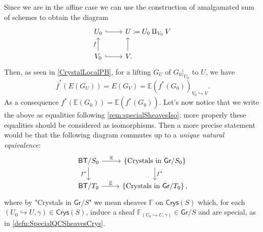 \begin{rem}\label{PBCrystals}
	Since we are in the affine case we can use the construction of amalgamated
	sum of schemes to obtain the diagram
	\begin{equation*}
	\begin{tikzcd}[/tikz/column 2/.append style={anchor=base west}]
		U_0 \arrow[r, "", hookrightarrow] &
		U \coloneqq U_0 \amalg_{V_0} V \\
		V_0 \arrow[u, "f", rightarrow] 
		\arrow[r, "", hookrightarrow] &
		V \arrow[u, "", rightarrow, end anchor={[xshift=1.84ex,yshift=0.29ex]south west},
		start anchor={[xshift=0.38ex]}] 
	.\end{tikzcd}
	\end{equation*}
	Then, as seen in \cref{CrystalLocalPB}, for a lifting $G_U$ 
	of $\left.G_0\right|_{U_0}$ to $U$, we have
	\begin{equation*}
		\overline{f}^* \left( E(G_U) \right) =
		E(G_V) = \mathbb{E} \left( f^* (G_0) \right)_{V_0 \hookrightarrow V}
	.\end{equation*}
	As a consequence $f^* \left( \mathbb{E}(G_0) \right) =
	\mathbb{E}\left( f^*(G_0) \right)$.
	Let's now notice that we write the above as equalities following \cref{rem:specialSheavesIso};
	more properly these equalities should be considered as isomorphisms.
	Then a more precise statement would be that the following diagram
	commutes up to a {\em unique natural equivalence}:
	\begin{equation*}
	\begin{tikzcd}
		\mathsf{BT}/S_0
		\arrow[r, "\mathbb{E}", rightarrow] 
		\arrow[d, "f^*"', rightarrow] &
		\left\{ \text{Crystals in } \mathsf{Gr}/S_0 \right\}
		\arrow[d, "f^*", rightarrow] \\
		\mathsf{BT}/T_0 \arrow[r, "\mathbb{E}", rightarrow] &
		\left\{ \text{Crystals in } \mathsf{Gr}/T_0 \right\}
	,\end{tikzcd}
	\end{equation*}
	where by "Crystals in $\mathsf{Gr}/S$" we mean sheaves $\mathbb{F}$ on $\mathsf{Crys}(S)$
	which, for each $\left(U_0 \hookrightarrow U, \gamma\right) \in \mathsf{Crys}(S)$,
	induce a sheaf $\mathbb{F}_{\left(U_0 \hookrightarrow U, \gamma\right)} \in \mathsf{Gr}/S$
	and are special, as in \cref{defn:SpecialQCSheavesCrys}.
\end{rem}


